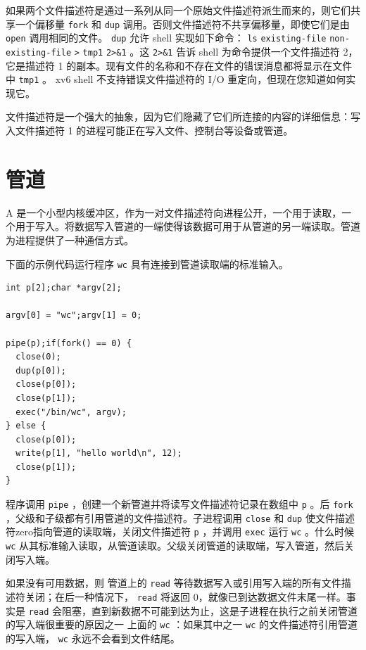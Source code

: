 \documentclass[UTF8]{article}
\begin{document}
如果两个文件描述符是通过一系列从同一个原始文件描述符派生而来的，则它们共享一个偏移量
    \lstinline{fork}    和
    \lstinline{dup}    调用。否则文件描述符不共享偏移量，即使它们是由
    \lstinline{open}    调用相同的文件。
    \lstinline{dup}    允许 shell 实现如下命令：
    \lstinline{ls}   
    \lstinline{existing-file}   
    \lstinline{non-existing-file}   
    \lstinline{>}   
    \lstinline{tmp1}   
    \lstinline{2>&1}    。这
    \lstinline{2>&1}    告诉 shell 为命令提供一个文件描述符 2，它是描述符 1 的副本。现有文件的名称和不存在文件的错误消息都将显示在文件中
    \lstinline{tmp1}    。 xv6 shell 不支持错误文件描述符的 I/O 重定向，但现在您知道如何实现它。  

文件描述符是一个强大的抽象，因为它们隐藏了它们所连接的内容的详细信息：写入文件描述符 1 的进程可能正在写入文件、控制台等设备或管道。
    \section{管道  }     

A
        是一个小型内核缓冲区，作为一对文件描述符向进程公开，一个用于读取，一个用于写入。将数据写入管道的一端使得该数据可用于从管道的另一端读取。管道为进程提供了一种通信方式。  

下面的示例代码运行程序
    \lstinline{wc}    具有连接到管道读取端的标准输入。
    \begin{lstlisting}[]int p[2];char *argv[2];

argv[0] = "wc";argv[1] = 0;

pipe(p);if(fork() == 0) {
  close(0);
  dup(p[0]);
  close(p[0]);
  close(p[1]);
  exec("/bin/wc", argv);
} else {
  close(p[0]);
  write(p[1], "hello world\n", 12);
  close(p[1]);
}
\end{lstlisting}    程序调用
    \lstinline{pipe}    ，创建一个新管道并将读写文件描述符记录在数组中
    \lstinline{p}    。后
    \lstinline{fork}    ，父级和子级都有引用管道的文件描述符。子进程调用   \lstinline{close}   和   \lstinline{dup}   使文件描述符zero指向管道的读取端，关闭文件描述符
    \lstinline{p}    ，并调用   \lstinline{exec}   运行
    \lstinline{wc}    。什么时候
    \lstinline{wc}    从其标准输入读取，从管道读取。父级关闭管道的读取端，写入管道，然后关闭写入端。  

如果没有可用数据，则
 管道上的    \lstinline{read}    等待数据写入或引用写入端的所有文件描述符关闭；在后一种情况下，
    \lstinline{read}    将返回 0，就像已到达数据文件末尾一样。事实是
    \lstinline{read}    会阻塞，直到新数据不可能到达为止，这是子进程在执行之前关闭管道的写入端很重要的原因之一
 上面的    \lstinline{wc}   ：如果其中之一
    \lstinline{wc}    的文件描述符引用管道的写入端，
    \lstinline{wc}    永远不会看到文件结尾。  
\end{document}
